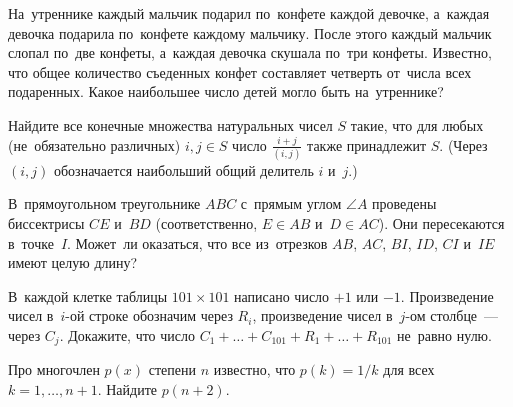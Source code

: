 \begin{problems}

\item
На~утреннике каждый мальчик подарил по~конфете каждой девочке, а~каждая девочка
подарила по~конфете каждому мальчику.
После этого каждый мальчик слопал по~две конфеты, а~каждая девочка скушала
по~три конфеты.
Известно, что общее количество съеденных конфет составляет четверть от~числа
всех подаренных.
Какое наибольшее число детей могло быть на~утреннике?


\item
Найдите все конечные множества натуральных чисел $S$ такие, что для любых
(не~обязательно различных) $i, j \in S$ число $\frac{i + j}{(i, j)}$ также
принадлежит $S$.
(Через $(i, j)$ обозначается наибольший общий делитель $i$ и~$j$.)


\item
В~прямоугольном треугольнике $ABC$ с~прямым углом $\angle A$ проведены
биссектрисы $CE$ и~$BD$ (соответственно, $E \in AB$ и~$D \in AC$).
Они пересекаются в~точке~$I$.
Может~ли оказаться, что все из~отрезков $AB$, $AC$, $BI$, $ID$, $CI$ и~$IE$
имеют целую длину?


\item
В~каждой клетке таблицы $101 \times 101$ написано число $+1$ или $-1$.
Произведение чисел в~$i$-ой строке обозначим через $R_i$, произведение чисел
в~$j$-ом столбце~--- через $C_j$.
Докажите, что число $C_1 + \ldots + C_{101} + R_1 + \ldots + R_{101}$
не~равно нулю.



\item
Про многочлен $p(x)$ степени $n$ известно, что $p(k) = 1 / k$
для всех $k = 1, \ldots, n + 1$.
Найдите $p(n + 2)$.


\end{problems}
\fi %



